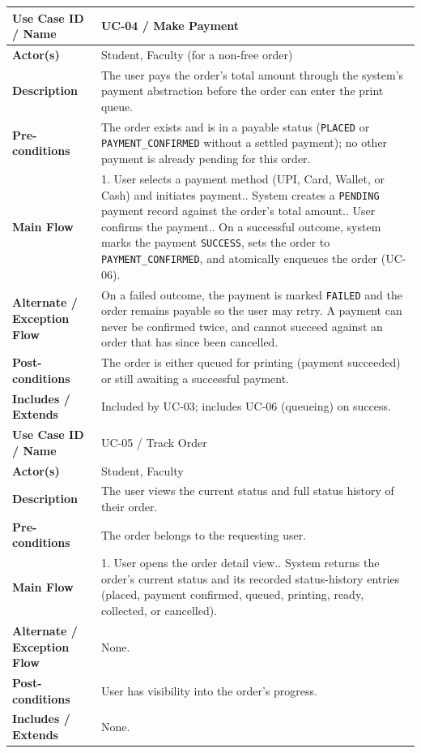 \documentclass[12pt,a4paper]{report}
\begin{document}
\begin{center}
\begin{longtable}{|p{3.3cm}|p{10.7cm}|}
\textbf{Use Case ID / Name} & UC-04 / Make Payment \\ \hline
\textbf{Actor(s)} & Student, Faculty (for a non-free order) \\ \hline
\textbf{Description} & The user pays the order's total amount through the system's payment abstraction before the order can enter the print queue. \\ \hline
\textbf{Pre-conditions} & The order exists and is in a payable status (\texttt{PLACED} or \texttt{PAYMENT\_CONFIRMED} without a settled payment); no other payment is already pending for this order. \\ \hline
\textbf{Main Flow} & 1. User selects a payment method (UPI, Card, Wallet, or Cash) and initiates payment.\newline 2. System creates a \texttt{PENDING} payment record against the order's total amount.\newline 3. User confirms the payment.\newline 4. On a successful outcome, system marks the payment \texttt{SUCCESS}, sets the order to \texttt{PAYMENT\_CONFIRMED}, and atomically enqueues the order (UC-06). \\ \hline
\textbf{Alternate / Exception Flow} & On a failed outcome, the payment is marked \texttt{FAILED} and the order remains payable so the user may retry. A payment can never be confirmed twice, and cannot succeed against an order that has since been cancelled. \\ \hline
\textbf{Post-conditions} & The order is either queued for printing (payment succeeded) or still awaiting a successful payment. \\ \hline
\textbf{Includes / Extends} & Included by UC-03; includes UC-06 (queueing) on success. \\ \hline

\textbf{Use Case ID / Name} & UC-05 / Track Order \\ \hline
\textbf{Actor(s)} & Student, Faculty \\ \hline
\textbf{Description} & The user views the current status and full status history of their order. \\ \hline
\textbf{Pre-conditions} & The order belongs to the requesting user. \\ \hline
\textbf{Main Flow} & 1. User opens the order detail view.\newline 2. System returns the order's current status and its recorded status-history entries (placed, payment confirmed, queued, printing, ready, collected, or cancelled). \\ \hline
\textbf{Alternate / Exception Flow} & None. \\ \hline
\textbf{Post-conditions} & User has visibility into the order's progress. \\ \hline
\textbf{Includes / Extends} & None. \\ \hline


\end{longtable}
\end{center}
\end{document}

